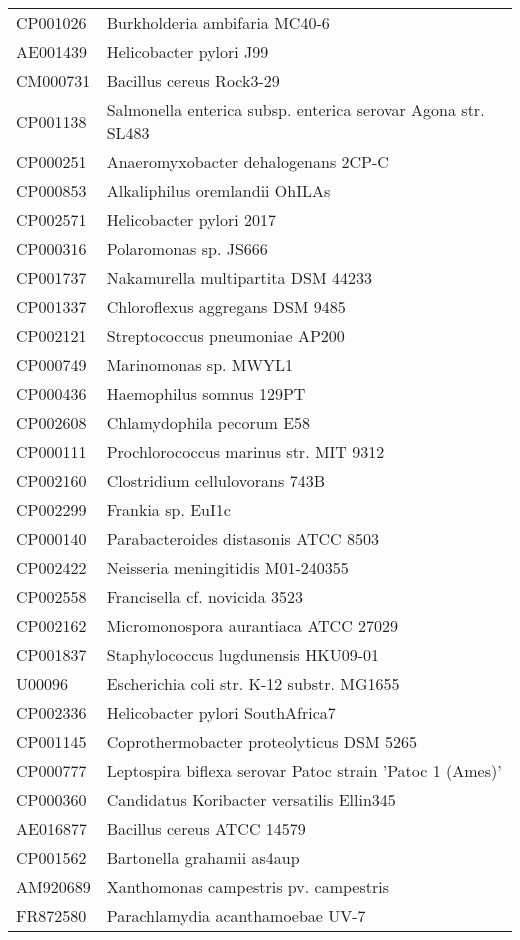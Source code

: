 \begin{longtable}{ll}
CP001026 & Burkholderia ambifaria MC40-6\\
AE001439 & Helicobacter pylori J99\\
CM000731 & Bacillus cereus Rock3-29\\
CP001138 & Salmonella enterica subsp. enterica serovar Agona str. SL483\\
CP000251 & Anaeromyxobacter dehalogenans 2CP-C\\
CP000853 & Alkaliphilus oremlandii OhILAs\\
CP002571 & Helicobacter pylori 2017\\
CP000316 & Polaromonas sp. JS666\\
CP001737 & Nakamurella multipartita DSM 44233\\
CP001337 & Chloroflexus aggregans DSM 9485\\
CP002121 & Streptococcus pneumoniae AP200\\
CP000749 & Marinomonas sp. MWYL1\\
CP000436 & Haemophilus somnus 129PT\\
CP002608 & Chlamydophila pecorum E58\\
CP000111 & Prochlorococcus marinus str. MIT 9312\\
CP002160 & Clostridium cellulovorans 743B\\
CP002299 & Frankia sp. EuI1c\\
CP000140 & Parabacteroides distasonis ATCC 8503\\
CP002422 & Neisseria meningitidis M01-240355\\
CP002558 & Francisella cf. novicida 3523\\
CP002162 & Micromonospora aurantiaca ATCC 27029\\
CP001837 & Staphylococcus lugdunensis HKU09-01\\
U00096 & Escherichia coli str. K-12 substr. MG1655\\
CP002336 & Helicobacter pylori SouthAfrica7\\
CP001145 & Coprothermobacter proteolyticus DSM 5265\\
CP000777 & Leptospira biflexa serovar Patoc strain 'Patoc 1 (Ames)'\\
CP000360 & Candidatus Koribacter versatilis Ellin345\\
AE016877 & Bacillus cereus ATCC 14579\\
CP001562 & Bartonella grahamii as4aup\\
AM920689 & Xanthomonas campestris pv. campestris\\
FR872580 & Parachlamydia acanthamoebae UV-7\\

\end{longtable}
